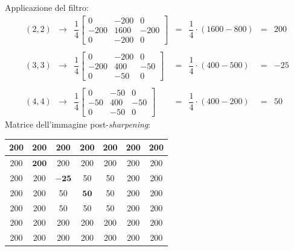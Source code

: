 \documentclass[a4paper]{article}
\begin{document}
	Applicazione del filtro:
	\begin{equation*}
		\begin{array}{lllllll}
			\left(2,2\right) & \longrightarrow	&
			\dfrac{1}{4}\begin{bmatrix}
				0 & -200 & 0 \\
				-200 & 1600 & -200 \\
				0 & -200 & 0
			\end{bmatrix} & = & \dfrac{1}{4} \cdot \left(1600 - 800\right) & = & 200 \\
			\\
			\left(3,3\right) & \longrightarrow	&
			\dfrac{1}{4}\begin{bmatrix}
				0 & -200 & 0 \\
				-200 & 400 & -50 \\
				0 & -50 & 0
			\end{bmatrix} & = & \dfrac{1}{4} \cdot \left(400 - 500\right) & = & -25 \\
			\\
			\left(4,4\right) & \longrightarrow	&
			\dfrac{1}{4}\begin{bmatrix}
				0 & -50 & 0 \\
				-50 & 400 & -50 \\
				0 & -50 & 0
			\end{bmatrix} & = & \dfrac{1}{4} \cdot \left(400 - 200\right) & = & 50
		\end{array}
	\end{equation*}
	Matrice dell'immagine post-\emph{sharpening}:
	\begin{center}
		\begin{tabular}{| c | c | c | c | c | c | c |}
			\hline
			200 & 200 & 200 & 200 & 200 & 200 & 200 \\
			\hline
			200 & \textcolor{Red3}{$\boldsymbol{200}$} & 200 & 200 & 200 & 200 & 200 \\
			\hline
			200 & 200 & \textcolor{Red3}{$\boldsymbol{-25}$} &  50 &  50 & 200 & 200 \\
			\hline
			200 & 200 &  50 & \textcolor{Red3}{$\boldsymbol{50}$} &  50 & 200 & 200 \\
			\hline
			200 & 200 &  50 &  50 &  50 & 200 & 200 \\
			\hline
			200 & 200 & 200 & 200 & 200 & 200 & 200 \\
			\hline
			200 & 200 & 200 & 200 & 200 & 200 & 200 \\
			\hline
		\end{tabular}
	\end{center}\newpage
\end{document}
